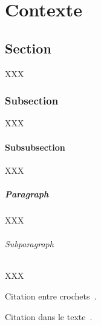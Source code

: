 \chapter{Contexte}
\label{chap:contexte}

\section{Section}

XXX

\subsection{Subsection}

XXX

\subsubsection{Subsubsection}

XXX

\paragraph{Paragraph}

XXX

\subparagraph{Subparagraph}

XXX

Citation entre crochets~\citep{ref1,ref2}.

Citation dans le texte~\citet{ref3}.
